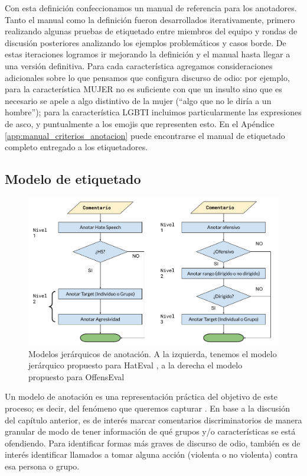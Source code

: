 Con esta definición confeccionamos un manual de referencia para los anotadores. Tanto el manual como la definición fueron desarrollados iterativamente, primero realizando algunas pruebas de etiquetado entre miembros del equipo y rondas de discusión posteriores analizando los ejemplos problemáticos y casos borde. De estas iteraciones logramos ir mejorando la definición y el manual hasta llegar a una versión definitiva. Para cada característica agregamos consideraciones adicionales sobre lo que pensamos que configura discurso de odio: por ejemplo, para la característica MUJER no es suficiente con que un insulto sino que es necesario se apele a algo distintivo de la mujer (``algo que no le diría a un hombre''); para la característica LGBTI incluimos particularmente las expresiones de asco, y puntualmente a los emojis que representen esto. En el Apéndice \ref{app:manual_criterios_anotacion} puede encontrarse el manual de etiquetado completo entregado a los etiquetadores.



\subsection{Modelo de etiquetado}


\begin{figure}[t]
    \centering
    \includegraphics[width=\textwidth]{img/05/modelos_jerarquicos.pdf}
    \caption{Modelos jerárquicos de anotación. A la izquierda, tenemos el modelo jerárquico propuesto para HatEval \cite{hateval2019semeval}, a la derecha el modelo propuesto para OffensEval \cite{zampieri2019semeval2019}}
    \label{fig:modelos_offenseval_hateval}
\end{figure}


Un modelo de anotación es una representación práctica del objetivo de este proceso; es decir, del fenómeno que queremos capturar \cite{pustejovsky2012natural}. En base a la discusión del capítulo anterior, es de interés marcar comentarios discriminatorios de manera granular de modo de tener información de qué grupos y/o características se está ofendiendo. Para identificar formas más graves de discurso de odio, también es de interés identificar llamados a tomar alguna acción (violenta o no violenta) contra esa persona o grupo.


